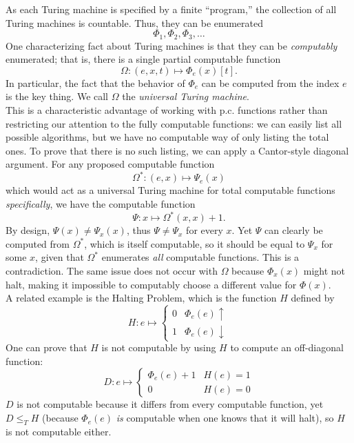 \documentclass{amsart}
\begin{document}
	As each Turing machine is specified by a finite ``program,'' the collection of all Turing machines is countable. Thus, they can be enumerated
	$$
	\Phi_1,\Phi_2,\Phi_3,\dots
	$$
	One characterizing fact about Turing machines is that they can be \textit{computably} enumerated; that is, there is a single partial computable function
	$$
	\Omega: (e,x,t) \mapsto \Phi_e(x)[t].
	$$
	In particular, the fact that the behavior of $\Phi_e$ can be computed from the index $e$ is the key thing. We call $\Omega$ the \textit{universal Turing machine}.\\
	\indent This is a characteristic advantage of working with p.c. functions rather than restricting our attention to the fully computable functions: we can easily list all possible algorithms, but we have no computable way of only listing the total ones. To prove that there is no such listing, we can apply a Cantor-style diagonal argument. For any proposed computable function 
	$$\Omega^*: (e,x) \mapsto \Psi_e(x)$$
	which would act as a universal Turing machine for total computable functions \textit{specifically}, we have the computable function 
	$$
	\Psi: x\mapsto \Omega^*(x,x) + 1.
	$$
	By design, $\Psi(x)\neq \Psi_x(x)$, thus $\Psi\neq \Psi_x$ for every $x$. Yet $\Psi$ can clearly be computed from $\Omega^*$, which is itself computable, so it should be equal to $\Psi_x$ for some $x$, given that $\Omega^*$ enumerates \textit{all} computable functions. This is a contradiction. The same issue does not occur with $\Omega$ because $\Phi_x(x)$ might not halt, making it impossible to computably choose a different value for $\Phi(x)$.\\
	
	A related example is the Halting Problem, which is the function $H$ defined by
	$$
	H: e\mapsto \begin{cases}
		0 & \Phi_e(e)\uparrow\\
		1 & \Phi_e(e)\downarrow
	\end{cases}
	$$
	One can prove that $H$ is not computable by using $H$ to compute an off-diagonal function:
	$$
	D:e\mapsto \begin{cases}
		\Phi_e(e) + 1 & H(e)=1\\
		0 & H(e)=0
	\end{cases}
	$$
	$D$ is not computable because it differs from every computable function, yet $D\leq_T H$ (because $\Phi_e(e)$ \textit{is} computable when one knows that it will halt), so $H$ is not computable either.\\
	
\end{document}
